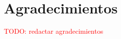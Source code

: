 \newpage{\ }
\thispagestyle{empty}
\chapter*{Agradecimientos}
\label{cap:acknowledgments}

\textcolor{red}{TODO: redactar agradecimientos}






